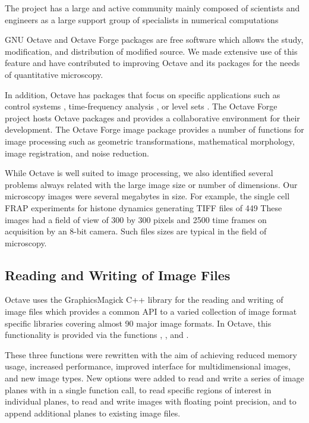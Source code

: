 The project has a large and active community
mainly composed of
scientists and engineers as a large support group of
specialists in numerical computations

GNU Octave and Octave Forge packages are free software which allows
the study, modification, and distribution of modified source.
We made extensive
use of this feature and have contributed to improving Octave and its
packages for the needs of quantitative microscopy.

In addition, Octave has
packages that focus on specific applications such as control
systems \citep{octave-control}, time-frequency analysis
\citep{octave-ltfat}, or level sets \citep{octave-level-set}.  The
Octave Forge project hosts
Octave packages and provides a collaborative environment for their
development.  The Octave Forge image package
provides a number of functions for image processing such as geometric
transformations, mathematical morphology, image registration, and
noise reduction.

While Octave is well suited to image
processing, we also identified several problems always related with
the large image size or number of dimensions.  Our microscopy images
were several megabytes in size.  For example, the single cell
FRAP experiments for histone dynamics generating TIFF files of 449
These images had a field of view of 300
by 300 pixels and 2500 time frames
on acquisition by an 8-bit camera.
Such files sizes are typical in the field of microscopy.

\subsection{Reading and Writing of Image Files}

Octave uses the GraphicsMagick C++ library for the reading and writing
of image files which provides a common API 
to a varied collection of
image format specific libraries covering almost
90 major image formats.  In Octave, this functionality is
provided via the functions , , and
.

These three functions were rewritten with the aim of achieving
reduced memory usage, increased performance, improved
interface for multidimensional images, and new image types.
New options were added to read and write a series of image planes
with in a single function call, to read specific regions of interest in
individual planes, to read and write images
with floating point precision, and to append additional planes to existing image
files.

